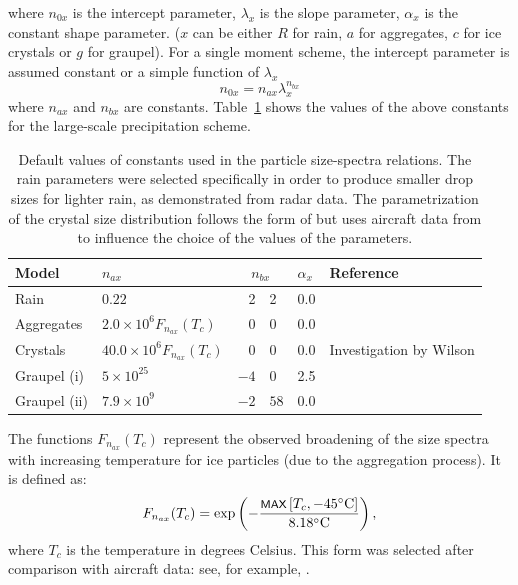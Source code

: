 \documentclass{UMDP_article}
\newcommand{\mmax}[1] {\mbox{\footnotesize \sf MAX} \left[#1\right]  }
\def\bq{\begin{equation}}
\def\eq{\end{equation}}
\begin{document}
where $n_{0x}$ is the intercept parameter, $\lambda_x$ is the slope parameter,
$\alpha_x$ is the constant shape parameter. ($x$ can be either $R$ for rain, 
$a$ for aggregates, $c$ for ice crystals or $g$ for graupel). 
For a single moment scheme, the intercept parameter is assumed
constant or a simple function of $\lambda_x$
\bq
    n_{0x}=n_{ax} \lambda_x^{n_{bx}}
   \label{eq:mic_nx0s}
\eq
where $n_{ax}$ and $n_{bx}$ are constants. Table~\ref{tab:mic_consts_psd} shows the
values of the above constants for the large-scale precipitation scheme.

\begin{table}[ht!]
\begin{center}
\begin{tabular}{llr@{.}lll}
\hline
Model & $n_{ax}$ & \multicolumn{2}{c}{$n_{bx}$} & $\alpha_x$   & Reference \\ 
\hline
Rain   & $0.22$ & 2&2 & 0.0 & \cite{Abel:Boutle:2012} \\
\hline
Aggregates & $2.0 \times 10^{6} F_{n_{ax}}(T_c)$  & 0&0  & 0.0 
& \cite{Cox:1988}\\
\hline
Crystals & $40.0 \times 10^{6} F_{n_{ax}}(T_c)$ & 0&0  & 0.0 
& Investigation by Wilson \\ 
\hline
Graupel (i)  &  $5 \times 10^{25}$   & $-4$    & $0$ & 2.5 & \cite{Ferrier:1994} \\
Graupel (ii) &  $7.9 \times 10^{9}$  & $-2$ & $58$ & 0.0  & \cite{Field:etal:2019} \\ 
\hline
\end{tabular}
\end{center}
\caption{Default values of constants used in the particle size-spectra relations. 
The rain parameters were selected specifically in order to produce 
smaller drop sizes for lighter rain, as demonstrated from radar data. 
The parametrization of the crystal size distribution follows the form of 
\cite{Cox:1988} but uses aircraft data from \cite{Field:1999} to influence 
the choice of the values of the parameters.}
\label{tab:mic_consts_psd}
\end{table}

The functions $F_{n_{ax}}(T_c)$ represent the observed broadening of the size
spectra with increasing temperature for ice particles (due to the aggregation 
process). It is defined as:
\bq
  F_{n_{ax}}(T_c) = \exp\left(- \frac{\mmax{T_c, -45^{\circ}\mathrm{C}}}
{8.18^{\circ}\mathrm{C}}\right),
\eq
where $T_c$ is the temperature in degrees Celsius.
This form was selected after comparison with aircraft data: see, for example, 
\cite{Field:1999, Field:2000}.
\end{document}
